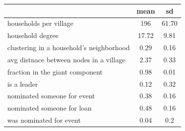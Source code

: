{
\def\sym#1{\ifmmode^{#1}\else\(^{#1}\)\fi}
\begin{tabular}{l*{1}{cc}}
\hline\hline
                                                                                                                                                                                                        &        mean&          sd\\
\hline
households per village                                                                                                                                                                                  &      196&       61.70\\
household degree                                                                                                                                                                                        &       17.72&        9.81\\
clustering in a household's neighborhood                                                                                                                                                                &        0.29&        0.16\\
avg distnace between nodes in a village                                                                                                                                                                 &        2.37&        0.33\\
fraction in the giant component                                                                                                                                                                         &        0.98&        0.01\\
is a leader                                                                                                                                                                                             &        0.12&        0.32\\
nominated someone for event                                                                                                                                                                             &        0.38&        0.16\\
nominated someone for loan                                                                                                                                                                              &        0.48&        0.16\\
was nominated for event                                                                                                                                                                                 &        0.04&        0.2\\

\end{tabular}}
